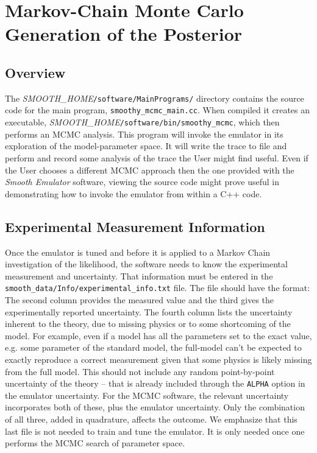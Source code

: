 \documentclass[UserManual.tex]{subfiles}
\begin{document}
\begin{sloppypar}
\section{Markov-Chain Monte Carlo Generation of the Posterior}\label{sec:mcmc}

\subsection{Overview}
The \textit{SMOOTH\_HOME}{\tt /software/MainPrograms/} directory contains the source code for the main program, {\tt smoothy\_mcmc\_main.cc}. When compiled it creates an executable, \textit{SMOOTH\_HOME}{\tt /software/bin/smoothy\_mcmc}, which then performs an MCMC analysis. This program will invoke the emulator in its exploration of the model-parameter space. It will write the trace to file and perform and record some analysis of the trace the User might find useful. Even if the User chooses a different MCMC approach then the one provided with the {\it Smooth Emulator} software, viewing the source code might prove useful in demonstrating how to invoke the emulator from within a C++ code. 

\subsection{Experimental Measurement Information}
Once the emulator is tuned and before it is applied to a Markov Chain investigation of the likelihood, the software needs to know the experimental measurement and uncertainty. That information must be entered in the {\tt smooth\_data/Info/experimental\_info.txt} file. The file should have the format:
\vspace*{-8pt}{\tt \begin{Verbatim}[commandchars=\\\{\}]
 observable_name_1  value_1    exp_uncertainty_1   theory_uncertainty_1
 observable_name_2  value_2    exp_uncertainty_2   theory_uncertainty_2
 observable_name_3  value_3    exp_uncertainty_3   theory_uncertainty_3
 observable_name_4  value_4    exp_uncertainty_4   theory_uncertainty_4
 .
\end{Verbatim}
}\vspace*{-8pt}
The second column provides the measured value and the third gives the experimentally reported uncertainty. The fourth column lists the uncertainty inherent to the theory, due to missing physics or to some shortcoming of the model. For example, even if a model has all the parameters set to the exact value, e.g. some parameter of the standard model, the full-model can't be expected to exactly reproduce a correct measurement given that some physics is likely missing from the full model. This should not include any random point-by-point uncertainty of the theory -- that is already included through the {\tt ALPHA} option in the emulator uncertainty. For the MCMC software, the relevant uncertainty incorporates both of these, plus the emulator uncertainty. Only the combination of all three, added in quadrature, affects the outcome. We emphasize that this last file is not needed to train and tune the emulator. It is only needed once one performs the MCMC search of parameter space. 


\end{sloppypar}
\end{document}
